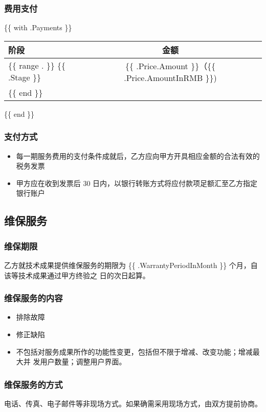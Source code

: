 \subsubsection{费用支付}
\{\{ with .Payments \}\}
\begin{tabular}{|l|c|r|}
  \hline
  \textbf{阶段}& \textbf{金额}\\
  \hline
  \{\{ range . \}\}
  \{\{ .Stage \}\}& \{\{ .Price.Amount \}\}（\{\{ .Price.AmountInRMB \}\})\\
  \hline
  \{\{ end \}\}
\end{tabular}
\{\{ end \}\}

\subsubsection{支付方式}
\begin{itemize}
  \item 每一期服务费用的支付条件成就后，乙方应向甲方开具相应金额的合法有效的税务发票
  \item 甲方应在收到发票后 30 日内，以银行转账方式将应付款项足额汇至乙方指定银行账户
\end{itemize}

\clearpage

\subsection{维保服务}

\subsubsection{维保期限}
乙方就技术成果提供维保服务的期限为 \{\{ .WarrantyPeriodInMonth \}\} 个月，自该等技术成果通过甲方终验之
日的次日起算。

\subsubsection{维保服务的内容}
\begin{itemize}
  \item 排除故障
  \item 修正缺陷
  \item 不包括对服务成果所作的功能性变更，包括但不限于增减、改变功能；增减最大并
发用户数量；调整用户界面。
\end{itemize}

\subsubsection{维保服务的方式}
电话、传真、电子邮件等非现场方式。如果确需采用现场方式，由双方提前协商。
